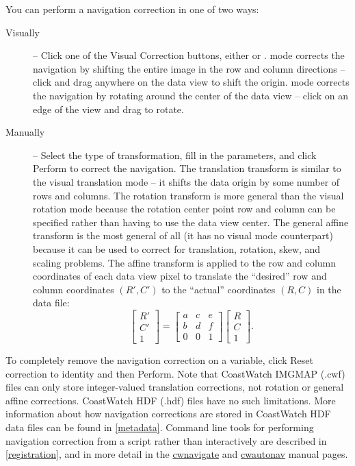 You can perform a navigation correction in one of two ways:
\begin{description}

\item[Visually] -- Click one of the {\gui Visual Correction} buttons,
either  or
.
 mode corrects the navigation by
shifting the entire image in the row and column directions --
click and drag anywhere on the data view to shift the origin.
 mode corrects the navigation
by rotating around the center of the data view -- click on an
edge of the view and drag to rotate.

\item[Manually] -- Select the type of transformation, fill in the
parameters, and click {\gui Perform} to correct the navigation.
The {\gui translation transform} is similar to the visual
translation mode -- it shifts the data origin by some number of
rows and columns.  The {\gui rotation transform} is more general
than the visual rotation mode because the rotation center point
row and column can be specified rather than having to use the
data view center.  The {\gui general affine transform} is the most
general of all (it has no visual mode counterpart) because it can
be used to correct for translation, rotation, skew, and scaling
problems.  The affine transform is applied to the row and column
coordinates of each data view pixel to translate the ``desired''
row and column coordinates $(R',C')$ to the ``actual''
coordinates $(R,C)$ in the data file:
\[
  \left[ \begin{array}{c}
           R' \\
           C' \\
           1
         \end{array}  
  \right]
  = 
  \left[ \begin{array}{ccc}
           a & c & e \\
           b & d & f \\
           0 & 0 & 1
         \end{array}
  \right]
  \left[ \begin{array}{c}
           R \\
           C \\
           1
         \end{array}
  \right] .
\]
\end{description}
To completely remove the navigation correction on a variable,
click {\gui Reset correction to identity} and then {\gui Perform}.
Note that CoastWatch IMGMAP (.cwf) files can only store
integer-valued translation corrections, not rotation or general
affine corrections.  CoastWatch HDF (.hdf) files have no such
limitations.  More information about how navigation corrections
are stored in CoastWatch HDF data files can be found in
\autoref{metadata}.  Command line tools for performing navigation
correction from a script rather than interactively are described
in \autoref{registration}, and in more detail in the
\hyperlink{cwnavigate}{cwnavigate} and
\hyperlink{cwautonav}{cwautonav} manual pages.

